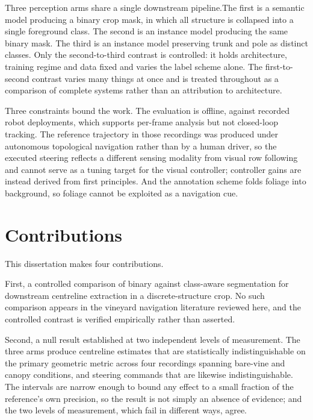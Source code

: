 Three perception arms share a single downstream pipeline.The first is a semantic model producing a binary crop mask, in which all structure is collapsed into a single foreground class. The second is an instance model producing the same binary
mask. The third is
an instance model preserving trunk and pole as distinct classes. Only the
second-to-third contrast is controlled: it holds architecture, training regime
and data fixed and varies the label scheme alone. The first-to-second contrast
varies many things at once and is treated throughout as a comparison of
complete systems rather than an attribution to architecture.

Three constraints bound the work. The evaluation is offline, against recorded
robot deployments, which supports per-frame analysis but not closed-loop
tracking. The reference trajectory in those recordings was produced under
autonomous topological navigation \citep{polvara2024} rather than by a human
driver, so the executed steering reflects a different sensing
modality from visual row following and cannot serve as a tuning target for the
visual controller; controller gains are instead derived from first principles.
And the annotation scheme folds foliage into background, so foliage cannot be
exploited as a navigation cue.

\section{Contributions}
\label{sec:intro-contributions}

This dissertation makes four contributions.

First, a controlled comparison of binary against class-aware segmentation for
downstream centreline extraction in a discrete-structure crop. No such
comparison appears in the vineyard navigation literature reviewed here, and
the controlled contrast is verified empirically rather than asserted.

Second, a null result established at two independent levels of measurement.
The three arms produce centreline estimates that are statistically
indistinguishable on the primary geometric metric across four recordings
spanning bare-vine and canopy conditions, and steering commands that are
likewise indistinguishable. The intervals are narrow enough to bound any
effect to a small fraction of the reference's own precision, so the result is
not simply an absence of evidence; and the two levels of measurement, which
fail in different ways, agree.

